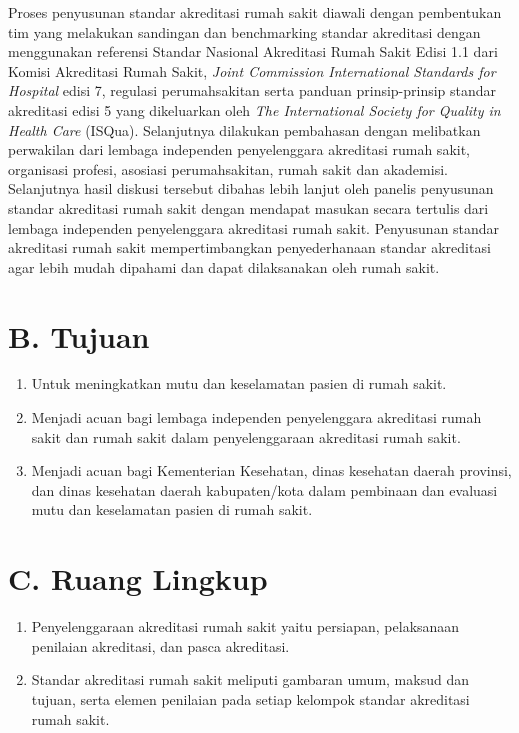 \documentclass[
]{book}
\providecommand{\tightlist}{%
  \setlength{\itemsep}{0pt}\setlength{\parskip}{0pt}}
\begin{document}
Proses penyusunan standar akreditasi rumah sakit diawali dengan pembentukan tim yang melakukan sandingan dan benchmarking standar akreditasi dengan menggunakan referensi Standar Nasional Akreditasi Rumah Sakit Edisi 1.1 dari Komisi Akreditasi Rumah Sakit, \emph{Joint Commission International Standards for Hospital} edisi 7, regulasi perumahsakitan serta panduan prinsip-prinsip standar akreditasi edisi 5 yang dikeluarkan oleh \emph{The International Society for Quality in Health Care} (ISQua). Selanjutnya dilakukan pembahasan dengan melibatkan perwakilan dari lembaga independen penyelenggara akreditasi rumah sakit, organisasi profesi, asosiasi perumahsakitan, rumah sakit dan akademisi. Selanjutnya hasil diskusi tersebut dibahas lebih lanjut oleh panelis penyusunan standar akreditasi rumah sakit dengan mendapat masukan secara tertulis dari lembaga independen penyelenggara akreditasi rumah sakit. Penyusunan standar akreditasi rumah sakit mempertimbangkan penyederhanaan standar akreditasi agar lebih mudah dipahami dan dapat dilaksanakan oleh rumah sakit.

\hypertarget{b.-tujuan}{%
\section*{B. Tujuan}\label{b.-tujuan}}

\begin{enumerate}
\def\labelenumi{\arabic{enumi}.}
\tightlist
\item
  Untuk meningkatkan mutu dan keselamatan pasien di rumah sakit.
\item
  Menjadi acuan bagi lembaga independen penyelenggara akreditasi rumah sakit dan rumah sakit dalam penyelenggaraan akreditasi rumah sakit.
\item
  Menjadi acuan bagi Kementerian Kesehatan, dinas kesehatan daerah provinsi, dan dinas kesehatan daerah kabupaten/kota dalam pembinaan dan evaluasi mutu dan keselamatan pasien di rumah sakit.
\end{enumerate}

\hypertarget{c.-ruang-lingkup}{%
\section*{C. Ruang Lingkup}\label{c.-ruang-lingkup}}

\begin{enumerate}
\def\labelenumi{\arabic{enumi}.}
\tightlist
\item
  Penyelenggaraan akreditasi rumah sakit yaitu persiapan, pelaksanaan penilaian akreditasi, dan pasca akreditasi.
\item
  Standar akreditasi rumah sakit meliputi gambaran umum, maksud dan tujuan, serta elemen penilaian pada setiap kelompok standar akreditasi rumah sakit.
\end{enumerate}
\end{document}
